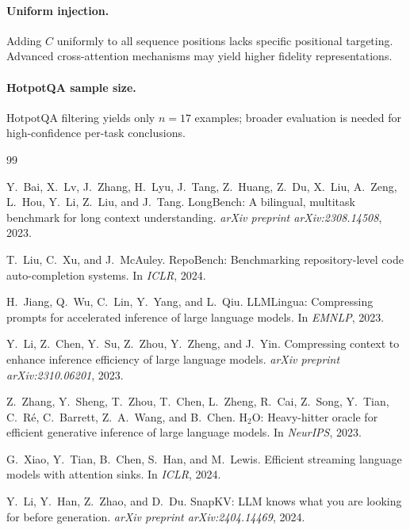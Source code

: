 \documentclass[11pt]{article}
\begin{document}
\paragraph{Uniform injection.} Adding $C$ uniformly to all sequence positions lacks specific positional targeting. Advanced cross-attention mechanisms may yield higher fidelity representations.

\paragraph{HotpotQA sample size.} HotpotQA filtering yields only $n = 17$ examples; broader evaluation is needed for high-confidence per-task conclusions.

\begin{thebibliography}{99}

Y.~Bai, X.~Lv, J.~Zhang, H.~Lyu, J.~Tang, Z.~Huang, Z.~Du, X.~Liu,
A.~Zeng, L.~Hou, Y.~Li, Z.~Liu, and J.~Tang.
\newblock LongBench: A bilingual, multitask benchmark for long context
  understanding.
\newblock \textit{arXiv preprint arXiv:2308.14508}, 2023.

T.~Liu, C.~Xu, and J.~McAuley.
\newblock RepoBench: Benchmarking repository-level code auto-completion systems.
\newblock In \textit{ICLR}, 2024.

H.~Jiang, Q.~Wu, C.~Lin, Y.~Yang, and L.~Qiu.
\newblock LLMLingua: Compressing prompts for accelerated inference of large
  language models.
\newblock In \textit{EMNLP}, 2023.

Y.~Li, Z.~Chen, Y.~Su, Z.~Zhou, Y.~Zheng, and J.~Yin.
\newblock Compressing context to enhance inference efficiency of large language
  models.
\newblock \textit{arXiv preprint arXiv:2310.06201}, 2023.

Z.~Zhang, Y.~Sheng, T.~Zhou, T.~Chen, L.~Zheng, R.~Cai, Z.~Song,
Y.~Tian, C.~R{\'e}, C.~Barrett, Z.~A.~Wang, and B.~Chen.
\newblock H$_2$O: Heavy-hitter oracle for efficient generative inference of
  large language models.
\newblock In \textit{NeurIPS}, 2023.

G.~Xiao, Y.~Tian, B.~Chen, S.~Han, and M.~Lewis.
\newblock Efficient streaming language models with attention sinks.
\newblock In \textit{ICLR}, 2024.

Y.~Li, Y.~Han, Z.~Zhao, and D.~Du.
\newblock SnapKV: LLM knows what you are looking for before generation.
\newblock \textit{arXiv preprint arXiv:2404.14469}, 2024.


\end{thebibliography}
\end{document}
